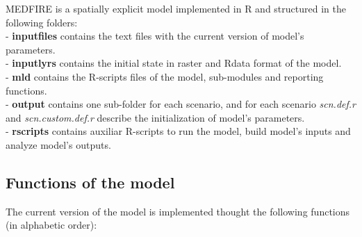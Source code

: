 \documentclass[
]{article}
\begin{document}
MEDFIRE is a spatially explicit model implemented in R and structured in
the following folders:\\
- \textbf{inputfiles} contains the text files with the current version
of model's parameters.\\
- \textbf{inputlyrs} contains the initial state in raster and Rdata
format of the model.\\
- \textbf{mld} contains the R-scripts files of the model, sub-modules
and reporting functions.\\
- \textbf{output} contains one sub-folder for each scenario, and for
each scenario \emph{scn.def.r} and \emph{scn.custom.def.r} describe the
initialization of model's parameters.\\
- \textbf{rscripts} contains auxiliar R-scripts to run the model, build
model's inputs and analyze model's outputs.

\hypertarget{functions-of-the-model}{%
\subsection{Functions of the model}\label{functions-of-the-model}}

The current version of the model is implemented thought the following
functions (in alphabetic order):
\end{document}
